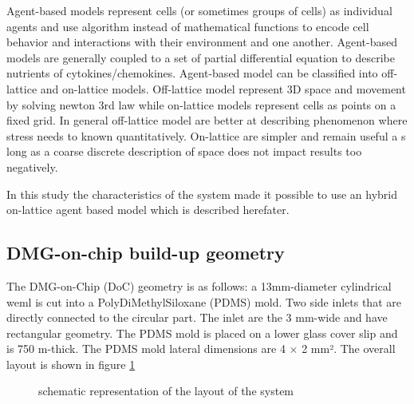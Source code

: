 \documentclass[11pt,a4paper]{article}
\begin{document}
Agent-based models represent cells (or sometimes groups of cells) as individual agents and use algorithm instead of mathematical functions to encode cell behavior and interactions with their environment and one another. Agent-based models are generally coupled to a set of partial differential equation to describe nutrients of cytokines/chemokines. Agent-based model can be classified into off-lattice and on-lattice models.\cite{Osborne2017} Off-lattice model represent 3D space and movement by solving newton 3rd law while on-lattice models represent cells as points on a fixed grid. In general off-lattice model are better at describing phenomenon where stress needs to known quantitatively. On-lattice are simpler and remain useful a	s long as a coarse discrete description of space does not impact results too negatively.

In this study the characteristics of the system made it possible to use an hybrid on-lattice agent based model which is described herefater.

\subsection{DMG-on-chip build-up geometry}
The DMG-on-Chip (DoC) geometry is as follows: a 13mm-diameter cylindrical weml is cut into a PolyDiMethylSiloxane (PDMS) mold. Two side inlets that are directly connected to the circular part. The inlet are the 3 mm-wide and have rectangular geometry. The PDMS mold is placed on a lower glass cover slip and is 750 \textmu m-thick. The PDMS mold lateral dimensions are 4 $\times$ 2 mm². The overall layout is shown in figure \ref{drawing}

\begin{figure}[ht]
\begin{center}
\caption{schematic representation of the layout of the system\label{drawing}}
\end{center}
\end{figure}
\end{document}
